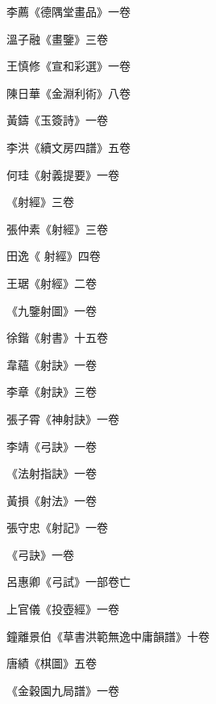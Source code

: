 \begin{pinyinscope}
 李薦《德隅堂畫品》一卷



 溫子融《畫鑒》三卷



 王慎修《宣和彩選》一卷



 陳日華《金淵利術》八卷



 黃鑄《玉簽詩》一卷



 李洪《續文房四譜》五卷



 何珪《射義提要》一卷



 《射經》三卷



 張仲素《射經》三卷



 田逸《
 射經》四卷



 王琚《射經》二卷



 《九鑒射圖》一卷



 徐鍇《射書》十五卷



 韋蘊《射訣》一卷



 李章《射訣》三卷



 張子霄《神射訣》一卷



 李靖《弓訣》一卷



 《法射指訣》一卷



 黃損《射法》一卷



 張守忠《射記》一卷



 《弓訣》一卷



 呂惠卿《弓試》一部卷亡



 上官儀《投壺經》一卷



 鐘離景伯《草書洪範無逸中庸韻譜》十卷



 唐績《棋圖》五卷



 《金穀園九局譜》一卷




\end{pinyinscope}
